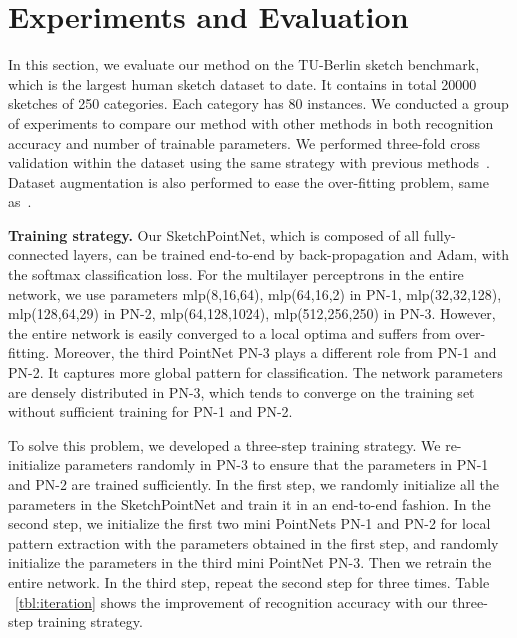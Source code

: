 \section{Experiments and Evaluation}
\label{sec:experiments}

In this section, we evaluate our method on the TU-Berlin sketch benchmark, which is the largest human sketch dataset to date.
%
It contains in total 20000 sketches of 250 categories. Each category has 80 instances.
%
We conducted a group of experiments to compare our method with other methods in both recognition accuracy and number of trainable parameters.
%
We performed three-fold cross validation within the dataset using
the same strategy with previous methods~\cite{Yu2015SketchaNetTB, Dupont2016DeepSketch2D}.
Dataset augmentation is also performed to ease the over-fitting problem, same as~\cite{Yu2015SketchaNetTB}.


\vspace{0.15cm}
\noindent \textbf{Training strategy.}
%
Our SketchPointNet, which is composed of all fully-connected layers, can be trained end-to-end by back-propagation and Adam, with the softmax classification loss.
%
For the multilayer perceptrons in the entire network, we use parameters mlp(8,16,64), mlp(64,16,2) in PN-1, mlp(32,32,128), mlp(128,64,29) in PN-2, mlp(64,128,1024), mlp(512,256,250) in PN-3.
%
However, the entire network is easily converged to a local optima and suffers from over-fitting.
Moreover, the third PointNet PN-3 plays a different role from PN-1 and PN-2. It captures more global pattern for classification.
%
The network parameters are densely distributed in PN-3, which tends to converge on the training set without sufficient training for PN-1 and PN-2.


To solve this problem, we developed a three-step training strategy.
%
We re-initialize parameters randomly in PN-3 to ensure that the parameters in PN-1 and PN-2 are trained sufficiently.
%
In the first step, we randomly initialize all the parameters in the SketchPointNet and train it in an end-to-end fashion.
%
In the second step, we initialize the first two mini PointNets PN-1 and PN-2 for local pattern extraction with the parameters obtained in the first step, and randomly initialize the parameters in the third mini PointNet PN-3. Then we retrain the entire network.
%
In the third step, repeat the second step for three times.
%
Table ~\ref{tbl:iteration} shows the improvement of recognition accuracy with our three-step training strategy.

